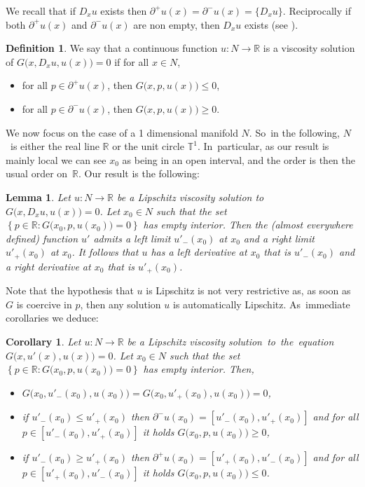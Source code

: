 \documentclass[JEP,XML,SOM,Unicode,NoFloatCountersInSection,published]{cedram}
\newtheorem{cor}[thm]{Corollary}
\newtheorem{lem}[thm]{Lemma}
\theoremstyle{definition}
\newtheorem{defn}[thm]{Definition}
\newcommand{\R}{\mathbb{R}}
\begin{document}
\begin{appendix}
We recall that if $D_x u$ exists then $\partial^+u(x)=\partial^-u(x) = \{D_xu\}$. Reciprocally if both $\partial^+u(x)$ and $\partial^-u(x)$ are non empty, then $D_x u$ exists (see \cite{CanSin04}).

\begin{defn}\rm
We say that a continuous function $u :N\to \R$ is a viscosity solution of $G\bigl(x,D_x u , u(x)\bigr) = 0$ if for all $x\in N$,
\begin{itemize}
\item for all $p\in \partial^+u(x)$, then $G\bigl(x,p,u(x)\bigr) \leqslant 0$,
\item for all $p\in \partial^-u(x)$, then $G\bigl(x,p,u(x)\bigr) \geqslant 0$.
\end{itemize}
\end{defn}

We now focus on the case of a 1 dimensional manifold $N$. So~in the following, $N$~is either the real line $\R$ or the unit circle $\mathbb{T}^1$. In~particular, as our result is mainly local we can see $x_0$ as being in an open interval, and the order is then the usual order on~$\R$. Our result is the following:

\begin{lem}\label{main-lemma}
Let $u : N\!\to\! \R$ be a Lipschitz viscosity solution to \hbox{$G\bigl(x,D_x u , u(x)\bigr) \!=\! 0$}. Let $x_0\in N$ such that the set $\left\{p\in \R: G\bigl(x_0,p,u(x_0)\bigr) = 0\right\}$ has empty interior. Then the (almost everywhere defined) function $u'$ admits a left limit $u'_-(x_0)$ at $x_0$ and a right limit $u'_+(x_0)$ at $x_0$. It follows that $u$ has a left derivative at $x_0$ that is $u'_-(x_0)$ and a right derivative at $x_0$ that is $u'_+(x_0)$.
\end{lem}
Note that the hypothesis that $u$ is Lipschitz is not very restrictive as, as soon as $G$ is coercive in $p$, then any solution $u$ is automatically Lipschitz. As~immediate corollaries we deduce:
\begin{cor}\label{cormax}
Let $u : N\to \R$ be a Lipschitz viscosity \hbox{solution to the equation} $G\bigl(x,u'(x) , u(x)\bigr) = 0$. Let $x_0\in N$ such that the set $\left\{p\in \R: G\bigl(x_0,p,u(x_0)\bigr) = 0\right\}$ has empty interior. Then,
\begin{itemize}
\setlength{\itemindent}{.8\parindent}
\item\!$G(x_0,u'_-(x_0),u(x_0)\bigr) = G(x_0,u'_+(x_0),u(x_0)\bigr)=0$,
\item\!if $ u'_-(x_0)\!\leqslant\! u'_+(x_0)$ then $\partial^-u(x_0) \!=\! [ u'_-(x_0) , u'_+(x_0)]$ and for all $p\!\in\! [ u'_-(x_0) , u'_+(x_0)]$ it holds $G(x_0,p,u(x_0)\bigr)\geqslant 0$,
\item\!if $ u'_-(x_0)\!\geqslant\! u'_+(x_0)$ then $\partial^+u(x_0) \!=\! [ u'_+(x_0) , u'_-(x_0)]$ and for all $p\!\in\! [ u'_+(x_0) , u'_-(x_0)]$ it holds $G(x_0,p,u(x_0)\bigr)\leqslant 0$.
\end{itemize}
\end{cor}


\end{appendix}
\end{document}
